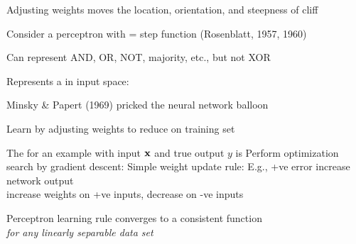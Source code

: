 \documentclass{article}
\begin{document}
\begin{huge}
Adjusting weights moves the location, orientation, and steepness of cliff


Consider a perceptron with  = step function (Rosenblatt, 1957, 1960)


Can represent AND, OR, NOT, majority, etc., but not XOR

Represents a  in input space:

\vspace*{0.1in}

\textwidth
{}

Minsky \& Papert (1969) pricked the neural network balloon



Learn by adjusting weights to reduce  on training set

The  for an example with input \(\mbox{{\bf x}}\) and
true output \(y\) is 
\mat{\[
  E = \frac{1}{2}\J{Err}^2  \equiv \frac{1}{2}(y-h_{\smbf{W}}(\x))^2\ ,
\]}
Perform optimization search by gradient descent:
Simple weight update rule:
E.g., +ve error \mat{$\implies$} increase network output\\
\mat{$\implies$} increase weights on +ve inputs, decrease on -ve inputs


Perceptron learning rule converges to a consistent function\\
\emph{for any linearly separable data set}


\end{huge}
\end{document}
